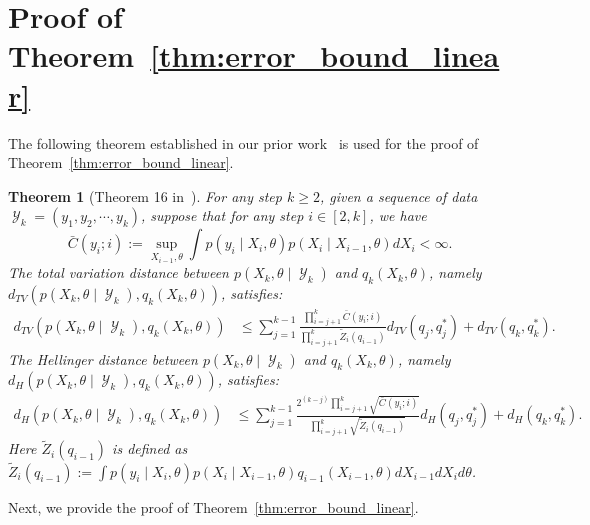 \documentclass[preprint,3p,times]{elsarticle}
\DeclareMathOperator{\Y}{\mathcal{Y}}
\newtheorem{theorem}{Theorem}
\begin{document}
\section{Proof of Theorem~\ref{thm:error_bound_linear}}
\label{app:proof_thm_linear}
The following theorem established in our prior work~\cite{wang_gorodetsky_2025_lipschitz_stability} is used for the proof of Theorem~\ref{thm:error_bound_linear}.
\begin{theorem}[Theorem 16 in~\cite{wang_gorodetsky_2025_lipschitz_stability}]
\label{thm:learning_bound_z}
For any step $k \geq 2$, given a sequence of data $\Y_k=(y_1,y_2,\cdots,y_k)$, suppose that for any step $i \in [2,k]$, we have
\begin{equation}
\bar{C}(y_i;i) := \sup_{X_{i-1},\theta}\int p(y_i \mid X_i,\theta)p(X_i \mid X_{i-1},\theta)dX_i < \infty.
\label{ieq:assumption_z}
\end{equation}
The total variation distance between $p(X_k,\theta \mid \Y_k)$ and $q_k(X_k,\theta)$, namely $d_{TV}(p(X_k,\theta \mid \Y_k), q_k(X_k,\theta))$, satisfies:
\begin{align}
d_{TV}\left(p(X_k,\theta \mid \Y_k), q_k(X_k,\theta)\right) &\leq \sum_{j=1}^{k-1}\frac{\prod_{i=j+1}^k\bar{C}(y_i;i)}{\prod_{i=j+1}^k \tilde{Z}_i(q_{i-1})}d_{TV}\left(q_j, q_j^*\right) + d_{TV}\left(q_k, q_k^*\right).
\end{align}
The Hellinger distance between $p(X_k,\theta \mid \Y_k)$ and $q_k(X_k,\theta)$, namely $d_{H}(p(X_k,\theta \mid \Y_k), q_k(X_k,\theta))$, satisfies:
\begin{align}
d_{H}(p(X_k,\theta \mid \Y_k), q_k(X_k,\theta)) &\leq \sum_{j=1}^{k-1}\frac{2^{(k-j)}\prod_{i=j+1}^k\sqrt{\bar{C}(y_i;i)}}{\prod_{i=j+1}^k\sqrt{ \tilde{Z}_i(q_{i-1})}}d_{H}\left(q_j, q_j^*\right) + d_{H}\left(q_k, q_k^*\right).
\end{align}
Here $\tilde{Z}_i(q_{i-1})$ is defined as $\tilde{Z}_i(q_{i-1}):= \int p(y_i \mid X_i,\theta)p(X_i \mid X_{i-1},\theta)q_{i-1}(X_{i-1},\theta)dX_{i-1}dX_id\theta$.
\end{theorem}
Next, we provide the proof of Theorem~\ref{thm:error_bound_linear}.
\end{document}
